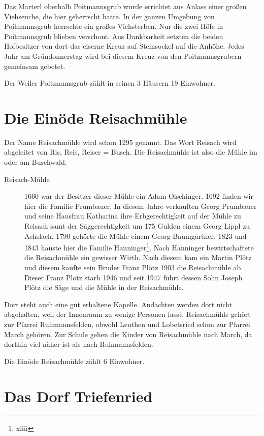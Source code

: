 \documentclass{book}
\begin{document}
Das Marterl oberhalb Poitmannsgrub wurde errichtet aus Anlass einer
großen Viehseuche, die hier geherrscht hatte. In der ganzen Umgebung von
Poitmannsgrub herrschte ein großes Viehsterben. Nur die zwei Höfe in
Poitmannsgrub blieben verschont. Aus Dankbarkeit setzten die beiden
Hofbesitzer von dort das eiserne Kreuz auf Steinsockel auf die Anhöhe.
Jedes Jahr am Gründonnerstag wird bei diesem Kreuz von den
Poitmannsgrubern gemeinsam gebetet.

Der Weiler Poitmannsgrub zählt in seinen 3 Häusern 19 Einwohner.

\section{Die Einöde Reisachmühle}

Der Name Reisachmühle wird schon 1295 genannt. Das Wort Reisach wird
abgeleitet von Ris, Reis, Reiser = Busch. Die Reisachmühle ist also die
Mühle im oder am Buschwald.

\begin{description}
\item[Reisach-Mühle] 1660 war der Besitzer dieser Mühle ein Adam
Oischinger. 1692 finden wir hier die Familie Prumbauer. In diesem Jahre
verkauften Georg Prumbauer und seine Hausfrau Katharina ihre
Erbgerechtigkeit auf der Mühle zu Reisach samt der Säggerechtigkeit um
175 Gulden einem Georg Lippl zu Achslach. 1790 gehörte die Mühle einem
Georg Baumgartner. 1823 und 1843 hauste hier die Familie
Hanninger\footnote{xliii}. Nach Hanninger bewirtschaftete die
Reisachmühle ein gewisser Wirth. Nach diesem kam ein Martin Plötz und
diesem kaufte sein Bruder Franz Plötz 1903 die Reisachmühle ab. Dieser
Franz Plötz starb 1946 und seit 1947 führt dessen Sohn Joseph Plötz die
Säge und die Mühle in der Reisachmühle.
\end{description}

Dort steht auch eine gut erhaltene Kapelle. Andachten werden dort nicht
abgehalten, weil der Innenraum zu wenige Personen fasst. Reisachmühle
gehört zur Pfarrei Ruhmannsfelden, obwohl Leuthen und Lobetsried schon
zur Pfarrei March gehören. Zur Schule gehen die Kinder von Reisachmühle
nach March, da dorthin viel näher ist als nach Ruhmannsfelden.

Die Einöde Reisachmühle zählt 6 Einwohner.

\section{Das Dorf Triefenried}
\end{document}
